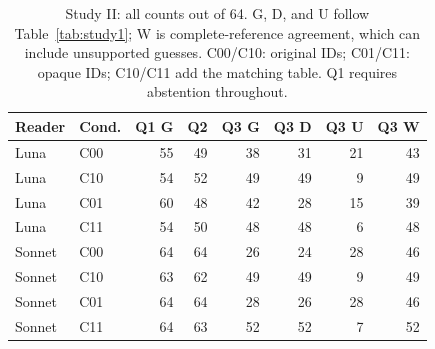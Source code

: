 \begin{table}[t]
\centering
\caption{Study II: all counts out of 64. G, D, and U follow Table~\ref{tab:study1}; W is complete-reference agreement, which can include unsupported guesses. C00/C10: original IDs; C01/C11: opaque IDs; C10/C11 add the matching table. Q1 requires abstention throughout.}
\label{tab:study2}
\setlength{\tabcolsep}{4pt}
\begin{tabular*}{\textwidth}{@{\extracolsep{\fill}}llrrrrrr@{}}
\toprule
Reader & Cond. & Q1 G & Q2 & Q3 G & Q3 D & Q3 U & Q3 W \\
\midrule
Luna & C00 & 55 & 49 & 38 & 31 & 21 & 43 \\
Luna & C10 & 54 & 52 & 49 & 49 & 9 & 49 \\
Luna & C01 & 60 & 48 & 42 & 28 & 15 & 39 \\
Luna & C11 & 54 & 50 & 48 & 48 & 6 & 48 \\
Sonnet & C00 & 64 & 64 & 26 & 24 & 28 & 46 \\
Sonnet & C10 & 63 & 62 & 49 & 49 & 9 & 49 \\
Sonnet & C01 & 64 & 64 & 28 & 26 & 28 & 46 \\
Sonnet & C11 & 64 & 63 & 52 & 52 & 7 & 52 \\
\bottomrule
\end{tabular*}
\end{table}
